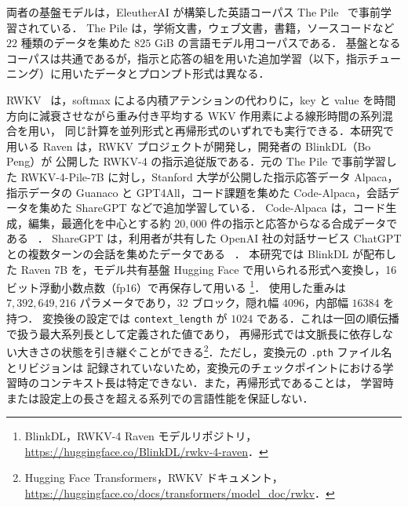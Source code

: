\documentclass[techrep,noauthor]{ipsj}
\newcommand{\rev}[1]{{\color{blue}#1}}
\begin{document}
両者の基盤モデルは，EleutherAI が構築した英語コーパス The Pile~\cite{gao2020pile} で事前学習されている．
The Pile は，学術文書，ウェブ文書，書籍，ソースコードなど $22$ 種類のデータを集めた $825$ GiB の言語モデル用コーパスである．
基盤となるコーパスは共通であるが，\rev{指示と応答の組を用いた追加学習（以下，指示チューニング）}に用いたデータとプロンプト形式は異なる．

RWKV~\cite{peng-etal-2023-rwkv} は，\rev{softmax による内積アテンション}の代わりに，\rev{key と value を時間方向に減衰させながら重み付き平均する} WKV 作用素による線形時間の系列混合を用い，
同じ計算を並列形式と再帰形式のいずれでも実行できる．本研究で用いる Raven は，RWKV プロジェクトが開発し，開発者の BlinkDL（Bo Peng）が
公開した RWKV-4 の指示追従版である．元の\rev{ The Pile で事前学習した} RWKV-4-Pile-7B に対し，Stanford 大学が公開した指示応答データ Alpaca，指示データの Guanaco と
GPT4All，コード課題を集めた Code-Alpaca，会話データを集めた ShareGPT などで追加学習している．
Code-Alpaca は，コード生成，編集，最適化を中心とする約 $20{,}000$ 件の指示と応答からなる合成データである
~\cite{codealpaca}．
ShareGPT は，利用者が共有した\rev{ OpenAI 社の対話サービス} ChatGPT との複数ターンの会話を集めたデータである
~\cite{lmsys-fastchat}．
本研究では BlinkDL が配布した Raven 7B を，モデル共有基盤 Hugging Face で用いられる形式へ変換し，\rev{16 ビット浮動小数点数（fp16）}で再保存して用いる
\footnote{BlinkDL，RWKV-4 Raven モデルリポジトリ，
\url{https://huggingface.co/BlinkDL/rwkv-4-raven}．}．
使用した重みは $7{,}392{,}649{,}216$ パラメータであり，$32$ ブロック，隠れ幅 $4096$，内部幅 $16384$ を持つ．
変換後の設定では \texttt{context\_length} が $1024$ である．これは一回の順伝播で扱う最大系列長として定義された値であり，
再帰形式では文脈長に依存しない大きさの状態を引き継ぐことができる\footnote{Hugging Face Transformers，RWKV ドキュメント，
\url{https://huggingface.co/docs/transformers/model_doc/rwkv}．}．ただし，変換元の \texttt{.pth} ファイル名とリビジョンは
記録されていないため，\rev{変換元のチェックポイント}における学習時のコンテキスト長は特定できない．また，再帰形式であることは，
学習時または設定上の長さを超える系列での言語性能を保証しない．
\end{document}
